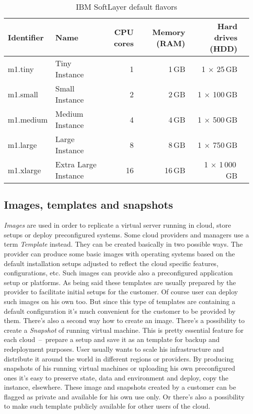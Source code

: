 \begin{table}[ht]
	\centering
	\begin{tabular}{llrrrr}
		\toprule
		Identifier & Name                 & CPU cores & Memory (RAM) & Hard drives (HDD)     \\
		\midrule
		m1.tiny    & Tiny Instance        & 1         & 1\,GB        & 1 $\times$ 25\,GB     \\
		m1.small   & Small Instance       & 2         & 2\,GB        & 1 $\times$ 100\,GB    \\
		m1.medium  & Medium Instance      & 4         & 4\,GB        & 1 $\times$ 500\,GB    \\
		m1.large   & Large Instance       & 8         & 8\,GB        & 1 $\times$ 750\,GB    \\
		m1.xlarge  & Extra Large Instance & 16        & 16\,GB       & 1 $\times$ 1\,000\,GB \\
		\bottomrule
	\end{tabular}
	\caption{IBM SoftLayer default flavors}\label{tab:IBM SoftLayer default flavors}
\end{table}

\subsection{Images, templates and snapshots}
\label{sub:Images, templates and snapshots}

\emph{Images} are used in order to replicate a virtual server running in cloud, store setups or deploy preconfigured systems. Some cloud providers and managers use a term \emph{Template} instead. They can be created basically in two possible ways. The provider can produce some basic images with operating systems based on the default installation setups adjusted to reflect the cloud specific features, configurations, etc. Such images can provide also a preconfigured application setup or platforms. As being said these templates are usually prepared by the provider to facilitate initial setups for the customer. Of course user can deploy such images on his own too. But since this type of templates are containing a default configuration it's much convenient for the customer to be provided by them. There's also a second way how to create an image. There's a possibility to create a \emph{Snapshot} of running virtual machine. This is pretty essential feature for each cloud \,--\, prepare a setup and save it as an template for backup and redeployment purposes. User usually wants to scale his infrastructure and distribute it around the world in different regions or providers. By producing snapshots of his running virtual machines or uploading his own preconfigured ones it's easy to preserve state, data and environment and deploy, copy the instance, elsewhere. These image and snapshots created by a customer can be flagged as private and available for his own use only. Or there's also a possibility to make such template publicly available for other users of the cloud.

